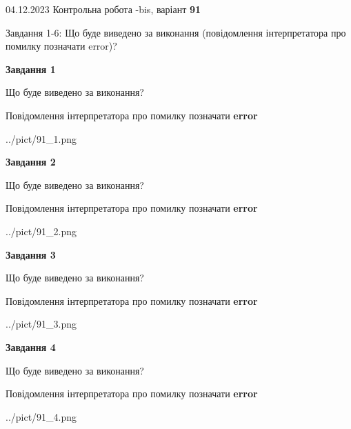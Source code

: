 \documentclass[12pt, ukrainian]{article}
\begin{document}
{{04.12.2023 Контрольна робота -bis, варіант  \No \textbf { 91 }\par}}
{

Завдання 1-6: Що буде виведено за виконання (повідомлення інтерпретатора про помилку позначати error)?


{\begin {center}\textbf{Завдання 1}\end {center}}\par
Що буде виведено за виконання? \par
Повідомлення інтерпретатора про помилку позначати \textbf{error}

\begin{center}
	{../pict/91_1.png}
\end{center}
\newpage

{\begin {center}\textbf{Завдання 2}\end {center}}\par
Що буде виведено за виконання? \par
Повідомлення інтерпретатора про помилку позначати \textbf{error}

\begin{center}
	{../pict/91_2.png}
\end{center}
\newpage

{\begin {center}\textbf{Завдання 3}\end {center}}\par
Що буде виведено за виконання? \par
Повідомлення інтерпретатора про помилку позначати \textbf{error}

\begin{center}
	{../pict/91_3.png}
\end{center}
\newpage

{\begin {center}\textbf{Завдання 4}\end {center}}\par
Що буде виведено за виконання? \par
Повідомлення інтерпретатора про помилку позначати \textbf{error}

\begin{center}
	{../pict/91_4.png}
\end{center}
\newpage

}
\end{document}
